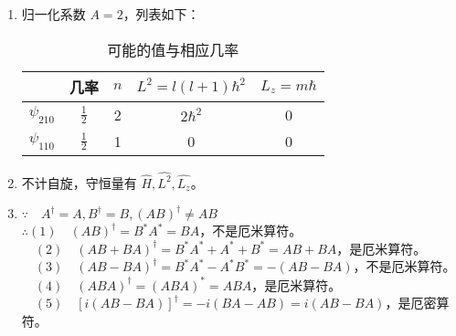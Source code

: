 
\begin{issues}
\issueDraft
\end{issues}


\subsection{ }
\begin{enumerate}
\item 归一化系数 $A=2$，列表如下：\\
\begin{table}[ht]
\centering
\caption{可能的值与相应几率}\label{TJU16A_tab1}
\begin{tabular}{|c|c|c|c|c|}
\hline
  & 几率 & $n$ & $L^{2}=l(l+1)\hbar^{2}$ & $L_{z}=m\hbar$ \\
\hline
$\psi_{210}$ & $ \frac{1}{2}$ & 2 & $2\hbar^2$ & 0 \\
\hline
$\psi_{110}$ & $ \frac{1}{2}$ & 1 & 0 & 0 \\
\hline
\end{tabular}
\end{table}
\item 不计自旋，守恒量有 $\hat H,\hat {L^2},\hat {L_z} $。
\item $\because \quad A^{\dagger} = A,B^{\dagger} = B,(AB)^{\dagger} \neq AB $ \\
$\therefore (1)\quad (AB)^{\dagger} = B^*A^* = BA $，不是厄米算符。 \\
$\quad (2)\quad (AB+BA)^{\dagger} = B^*A^*+A^*+B^* = AB+BA $，是厄米算符。 \\
$\quad (3)\quad (AB-BA)^{\dagger} = B^*A^*-A^*B^* = -(AB-BA) $，不是厄米算符。 \\
$\quad (4)\quad (ABA)^{\dagger} = (ABA)^* = ABA $，是厄米算符。 \\
$\quad (5)\quad [i(AB-BA)]^{\dagger} = -i(BA-AB) = i(AB-BA) $，是厄密算符。
\end{enumerate}
